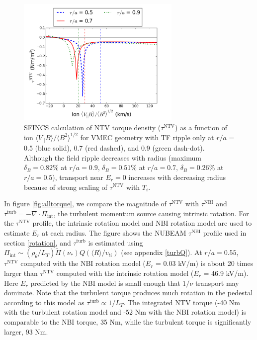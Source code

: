 \documentclass[aip, pop, preprint]{revtex4-1}
\numberwithin{figure}{section}
\numberwithin{equation}{section}
\begin{document}
\begin{figure}[h!]
\centering
\includegraphics[width=0.7\textwidth]
{Torque_radiusscaling.png}
\caption{\label{fig:Torque_radiusscaling} SFINCS calculation of NTV torque density ($\tau^{\text{NTV}}$) as a function of ion $\langle V_{||} B \rangle/\langle B^2 \rangle^{1/2}$ for VMEC geometry with TF ripple only at $r/a$ = 0.5 (blue solid), 0.7 (red dashed), and 0.9 (green dash-dot). Although the field ripple decreases with radius (maximum $\delta_B = 0.82\%$ at $r/a = 0.9$, $\delta_B = 0.51\%$ at $r/a = 0.7$, $\delta_B = 0.26\%$ at $r/a = 0.5$), transport near $E_r = 0$ increases with decreasing radius because of strong scaling of $\tau^{\text{NTV}}$ with $T_i$.\cite{Stringer1972,Shaing2003}}
\end{figure}

In figure \ref{fig:alltorque}, we compare the magnitude of $\tau^{\text{NTV}}$ with $\tau^{\text{NBI}}$ and $\tau^{\text{turb}} = -\nabla \cdot \Pi_{\text{int}}$, the turbulent momentum source causing intrinsic rotation. For the $\tau^{\text{NTV}}$ profile, the intrinsic rotation model and NBI rotation model are used to estimate $E_r$ at each radius. The figure shows the NUBEAM $\tau^{\text{NBI}}$ profile used in section \ref{rotation}, and $\tau^{\text{turb}}$ is estimated using $\Pi_{\text{int}} \sim (\rho_{\theta}/L_T) \widetilde{\Pi}(\nu_*) Q (\langle R \rangle/v_{ti})$ (see appendix \ref{turbQ}). At $r/a = 0.55$, $\tau^{\text{NTV}}$ computed with the NBI rotation model ($E_r$ = 0.03 kV/m) is about 20 times larger than $\tau^{\text{NTV}}$ computed with the intrinsic rotation model ($E_r$ = 46.9 kV/m). Here $E_r$ predicted by the NBI model is small enough that $1/\nu$ transport may dominate. Note that the turbulent torque produces much rotation in the pedestal according to this model as $\tau^{\text{turb}} \propto 1/L_T$. The integrated NTV torque (-40 Nm with the turbulent rotation model and -52 Nm with the NBI rotation model) is comparable to the NBI torque, 35 Nm, while the turbulent torque is significantly larger, 93 Nm. 
\end{document}
